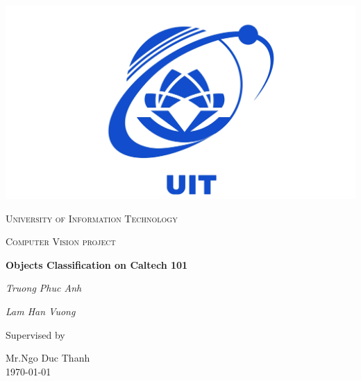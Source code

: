 \begin{titlepage}


\thispagestyle{empty}
\setlength\headheight{0pt} 
\begin{center}

\begin{center}
\includegraphics[width=0.5\linewidth]{images/logo.jpg}            
\end{center}	

        \vspace{0.25cm}
        {\scshape\LARGE University of Information Technology \par}
        \vspace{0.25cm}
        {\scshape\Large Computer Vision project\par}
        \vspace{0.5cm}

        {\Large\bfseries Objects Classification on Caltech 101\par}
        
        \vspace{0.5cm}
        {\Large\itshape Truong Phuc Anh\par}
        {\Large\itshape Lam Han Vuong\par}
        \vspace{0.25cm}

\vspace{1cm}
Supervised by\par
Mr.Ngo Duc Thanh \\
\vspace{1.5cm}
\large
\today

\end{center}

\clearpage
\restoregeometry
\end{titlepage}
